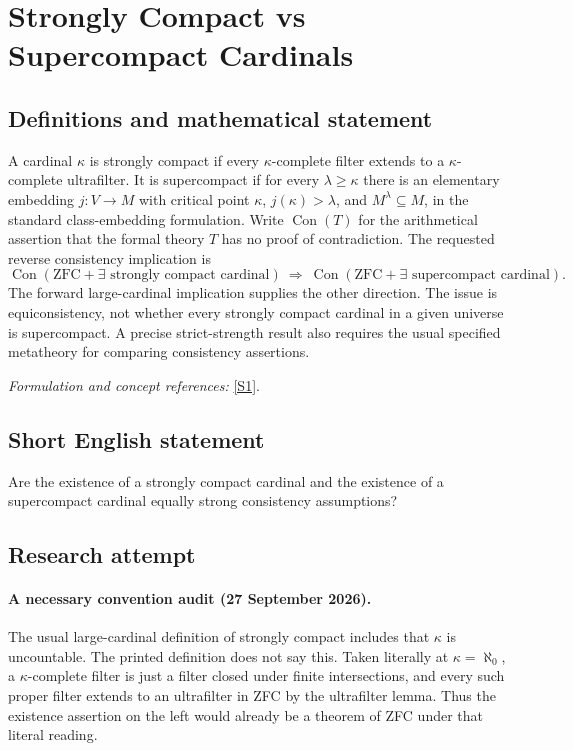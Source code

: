 \documentclass[11pt]{article}
\begin{document}
\section*{\texorpdfstring{Strongly Compact vs Supercompact Cardinals}{Strongly Compact vs Supercompact Cardinals}}\label{1354}
\subsection{Definitions and mathematical statement}
A cardinal $\kappa$ is strongly compact if every $\kappa$-complete filter extends to a $\kappa$-complete ultrafilter. It is supercompact if for every $\lambda\ge\kappa$ there is an elementary embedding $j:V\to M$ with critical point $\kappa$, $j(\kappa)>\lambda$, and $M^\lambda\subseteq M$, in the standard class-embedding formulation. Write $\operatorname{Con}(T)$ for the arithmetical assertion that the formal theory $T$ has no proof of contradiction. The requested reverse consistency implication is
\[
 \operatorname{Con}(\mathrm{ZFC}+\exists\text{ strongly compact cardinal})
 \ \Longrightarrow\
 \operatorname{Con}(\mathrm{ZFC}+\exists\text{ supercompact cardinal}).
\]
The forward large-cardinal implication supplies the other direction. The issue is equiconsistency, not whether every strongly compact cardinal in a given universe is supercompact. A precise strict-strength result also requires the usual specified metatheory for comparing consistency assertions.
\par\smallskip\textit{Formulation and concept references:} \href{https://arxiv.org/abs/1810.05058}{[S1]}.

\subsection{Short English statement}
Are the existence of a strongly compact cardinal and the existence of a supercompact cardinal equally strong consistency assumptions?
\subsection{Research attempt}
\paragraph{A necessary convention audit (27 September 2026).}
The usual large-cardinal definition of strongly compact includes that
$\kappa$ is uncountable. The printed definition does not say this.
Taken literally at $\kappa=\aleph_0$, a $\kappa$-complete filter is
just a filter closed under finite intersections, and every such proper
filter extends to an ultrafilter in ZFC by the ultrafilter lemma.
Thus the existence assertion on the left would already be a theorem
of ZFC under that literal reading.
\end{document}

